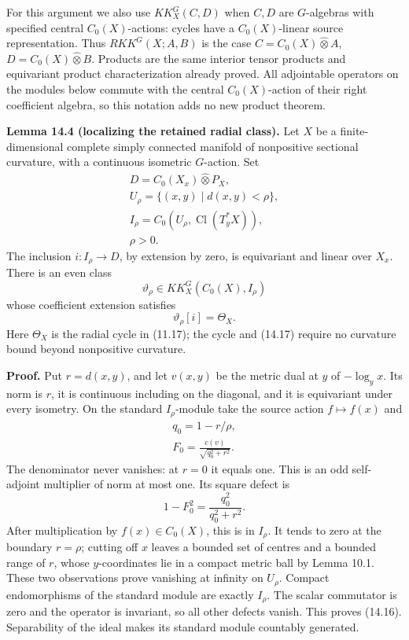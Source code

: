 \documentclass[
  11pt,
]{article}
\begin{document}
For this argument we also use \(KK_X^G(C,D)\) when \(C,D\) are
\(G\)-algebras with specified central \(C_0(X)\)-actions: cycles have a
\(C_0(X)\)-linear source representation. Thus \(RKK^G(X;A,B)\) is the
case \(C=C_0(X)\widehat\otimes A\), \(D=C_0(X)\widehat\otimes B\).
Products are the same interior tensor products and equivariant product
characterization already proved. All adjointable operators on the
modules below commute with the central \(C_0(X)\)-action of their right
coefficient algebra, so this notation adds no new product theorem.

\textbf{Lemma 14.4 (localizing the retained radial class).} Let \(X\) be
a finite-dimensional complete simply connected manifold of nonpositive
sectional curvature, with a continuous isometric \(G\)-action. Set \[
\begin{gathered}
D=C_0(X_x)\widehat\otimes P_X,\\
U_\rho=\{(x,y)\mid d(x,y)<\rho\},\\
I_\rho=C_0(U_\rho,\operatorname{Cl}(T_y^*X)),\\
\rho>0.
\end{gathered}
\tag{14.15}
\] The inclusion \(i:I_\rho\to D\), by extension by zero, is equivariant
and linear over \(X_x\). There is an even class \[
\vartheta_\rho\in KK_X^G(C_0(X),I_\rho)
\tag{14.16}
\] whose coefficient extension satisfies \[
\vartheta_\rho[i]=\Theta_X.
\tag{14.17}
\] Here \(\Theta_X\) is the radial cycle in (11.17); the cycle and
(14.17) require no curvature bound beyond nonpositive curvature.

\textbf{Proof.} Put \(r=d(x,y)\), and let \(v(x,y)\) be the metric dual
at \(y\) of \(-\log_yx\). Its norm is \(r\), it is continuous including
on the diagonal, and it is equivariant under every isometry. On the
standard \(I_\rho\)-module take the source action \(f\mapsto f(x)\) and
\[
\begin{gathered}
q_0=1-r/\rho,\\
F_0=\frac{c(v)}{\sqrt{q_0^2+r^2}}.
\end{gathered}
\tag{14.18}
\] The denominator never vanishes: at \(r=0\) it equals one. This is an
odd self-adjoint multiplier of norm at most one. Its square defect is \[
1-F_0^2=\frac{q_0^2}{q_0^2+r^2}.
\tag{14.19}
\] After multiplication by \(f(x)\in C_0(X)\), this is in \(I_\rho\). It
tends to zero at the boundary \(r=\rho\); cutting off \(x\) leaves a
bounded set of centres and a bounded range of \(r\), whose
\(y\)-coordinates lie in a compact metric ball by Lemma 10.1. These two
observations prove vanishing at infinity on \(U_\rho\). Compact
endomorphisms of the standard module are exactly \(I_\rho\). The scalar
commutator is zero and the operator is invariant, so all other defects
vanish. This proves (14.16). Separability of the ideal makes its
standard module countably generated.
\end{document}
